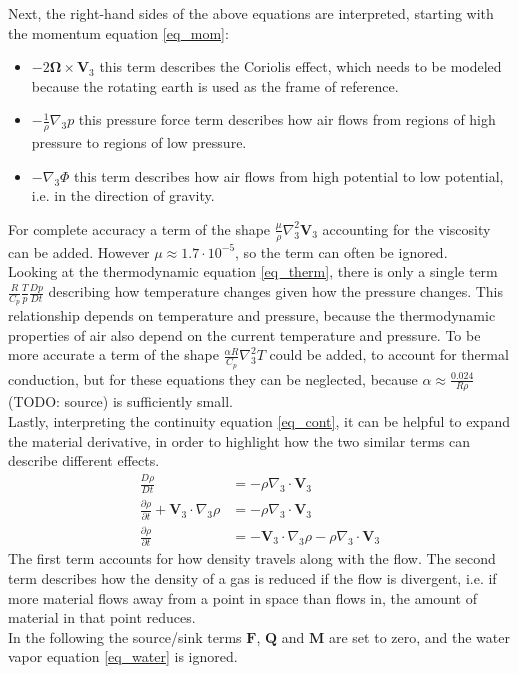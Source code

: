 Next, the right-hand sides of the above equations are interpreted, starting with the momentum equation \ref{eq_mom}:
\begin{itemize}
\item $-2\boldsymbol{\Omega}\times \textbf{V}_3$ this term describes the Coriolis effect, which needs to be modeled because the rotating earth is used as the frame of reference.
\item $- \frac{1}{\rho}\nabla _3 p$ this pressure force term describes how air flows from regions of high pressure to regions of low pressure.
\item $- \nabla _3 \Phi$ this term describes how air flows from high  potential to low potential, i.e. in the direction of gravity.
\end{itemize}
For complete accuracy a term of the shape $\frac{\mu}{\rho} \nabla _3^2 \textbf{V}_3$ accounting for the viscosity can be added.
However $\mu \approx 1.7\cdot 10^{-5}$, so the term can often be ignored.
\\
Looking at the thermodynamic equation \ref{eq_therm}, there is only a single term $\frac{R}{C_p}\frac{T}{p}\frac{Dp}{Dt}$ describing how temperature changes given how the pressure changes.
This relationship depends on temperature and pressure, because the thermodynamic properties of air also depend on the current temperature and pressure.
To be more accurate a term of the shape $\frac{\alpha R}{C_p}\nabla _3^2 T$ could be added, to account for thermal conduction, but for these equations they can be neglected, because $\alpha \approx \frac{0.024}{R\rho}$ (TODO: source) is sufficiently small.
\\
Lastly, interpreting the continuity equation \ref{eq_cont}, it can be helpful to expand the material derivative, in order to highlight how the two similar terms can describe different effects.
\begin{align*}
\frac{D\rho}{Dt} &= -\rho \nabla _3 \cdot \textbf{V}_3\\
\frac{\partial \rho}{\partial t} + \textbf{V}_3 \cdot \nabla _3 \rho &= -\rho \nabla _3 \cdot \textbf{V}_3\\
\frac{\partial \rho}{\partial t} &=  - \textbf{V}_3 \cdot \nabla _3 \rho -\rho \nabla _3 \cdot \textbf{V}_3
\end{align*}
The first term accounts for how density travels along with the flow.
The second term describes how the density of a gas is reduced if the flow is divergent, i.e. if more material flows away from a point in space than flows in, the amount of material in that point reduces.
\\
In the following the source/sink terms $\textbf{F}$, $\textbf{Q}$ and $\textbf{M}$ are set to zero, and the water vapor equation \ref{eq_water} is ignored.

